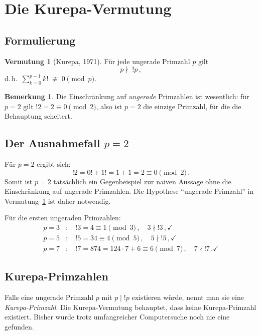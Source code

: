 \documentclass[12pt,a4paper]{amsart}
\theoremstyle{definition}
\newtheorem{bemerkung}[theorem]{Bemerkung}
\newtheorem{vermutung}[theorem]{Vermutung}
\begin{document}
\section{Die Kurepa-Vermutung}
\label{sec:vermutung}

\subsection{Formulierung}

\begin{vermutung}[Kurepa, 1971]\label{verm:kurepa}
Für jede ungerade Primzahl $p$ gilt
\[
  p \nmid\; !p\,,
\]
d.\,h.\ $\displaystyle\sum_{k=0}^{p-1} k! \;\not\equiv\; 0 \pmod{p}$.
\end{vermutung}

\begin{bemerkung}
Die Einschränkung auf \emph{ungerade} Primzahlen ist wesentlich: für $p = 2$
gilt $!2 = 2 \equiv 0 \pmod{2}$, also ist $p = 2$ die einzige Primzahl,
für die die Behauptung scheitert.
\end{bemerkung}

\subsection{Der Ausnahmefall $p = 2$}

Für $p = 2$ ergibt sich:
\[
  !2 = 0! + 1! = 1 + 1 = 2 \equiv 0 \pmod{2}\,.
\]
Somit ist $p = 2$ tatsächlich ein Gegenbeispiel zur naiven Aussage ohne die
Einschränkung auf ungerade Primzahlen.
Die Hypothese ``ungerade Primzahl'' in Vermutung~\ref{verm:kurepa} ist daher
notwendig.

Für die ersten ungeraden Primzahlen:
\begin{align*}
  p = 3 &: \quad !3 = 4 \equiv 1 \pmod{3}\,, \quad 3 \nmid !3\,, \checkmark\\
  p = 5 &: \quad !5 = 34 \equiv 4 \pmod{5}\,, \quad 5 \nmid !5\,, \checkmark\\
  p = 7 &: \quad !7 = 874 = 124 \cdot 7 + 6 \equiv 6 \pmod{7}\,, \quad 7 \nmid !7\,. \checkmark
\end{align*}

\subsection{Kurepa-Primzahlen}

Falls eine ungerade Primzahl $p$ mit $p \mid !p$ existieren würde, nennt man
sie eine \emph{Kurepa-Primzahl}.
Die Kurepa-Vermutung behauptet, dass keine Kurepa-Primzahl existiert.
Bisher wurde trotz umfangreicher Computersuche noch nie eine gefunden.
\end{document}
